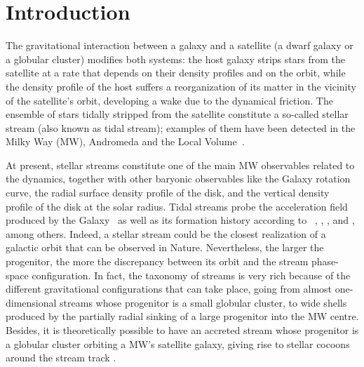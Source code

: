 \documentclass[twocolumn]{aa}
\begin{document}
   \maketitle

\section{Introduction}
The gravitational interaction between a galaxy and a satellite (a dwarf galaxy or a globular cluster) modifies both systems: the host galaxy strips stars from the satellite at a rate
that depends on their density profiles and on the orbit,
while the density profile of the host suffers a reorganization of its matter in the vicinity of the satellite's orbit, developing a wake due to the dynamical friction.
The ensemble of stars tidally stripped from the satellite constitute a so-called stellar stream (also known as tidal stream); examples of them have been detected in the Milky Way (MW), Andromeda and the Local Volume~\citep{Martínez-Delgado_2010}.

At present, stellar streams constitute one of the main MW observables related to the dynamics, together with other baryonic observables like the Galaxy rotation curve, the radial surface density profile of the disk, and the vertical density profile of the disk at the solar radius.
Tidal streams probe the acceleration field produced by the Galaxy~\citep{1999ApJ...512L.109J,1999A&A...348L..49Z,2009ApJ...703L..67L,2013MNRAS.436.2386L,2016ASSL..420..169J,Ibata_2016,2017ApJ...842..120I,2017A&A...603A..65T,2021MNRAS.502.4170R} as well as its formation history according to ~\citet{1999Natur.402...53H}, \citet{2020ARA&A..58..205H}, \citet{2022A&A...666A..64R}, and \citet{2023arXiv230708730C}, among others.
Indeed, a stellar stream could be the closest realization of a galactic orbit that can be observed in Nature.
Nevertheless, the larger the progenitor, the more the discrepancy between its orbit and the stream phase-space configuration. In fact, the taxonomy of streams is very rich \citep{2015MNRAS.450..575A} because of the different gravitational configurations that can take place, going from almost one-dimensional streams whose progenitor is a small globular cluster, to wide shells produced by the partially radial sinking of a large progenitor into the MW centre. Besides, it is theoretically possible to have an accreted stream whose progenitor is a globular cluster orbiting a MW's satellite galaxy, giving rise to stellar cocoons around the
stream track \citep{2018ApJ...861...69C,2019ApJ...881..106M,2021MNRAS.501..179M,2021ApJ...911L..32G,2022MNRAS.511.2339Q}.
\end{document}
